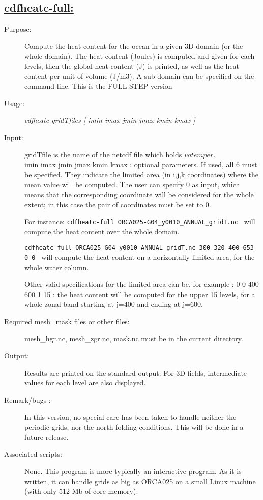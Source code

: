 \documentclass[a4paper,11pt]{article}
\begin{document}
\subsection*{\underline{cdfheatc-full:}}
\begin{description}
\item[Purpose:] Compute the heat content for the ocean in a given 3D domain (or the whole domain).
The heat content (Joules) is computed and given for each levels, then the global heat content (J) is printed, as well as the heat
content per unit of volume (J/m3). A sub-domain can be specified  on the command line. This is the FULL STEP version
\item[Usage:] {\em cdfheatc gridTfiles  [ imin imax jmin jmax kmin kmax ] }
\item[Input:] gridTfile is the name of the netcdf file which holds $votemper$.  \\

imin imax jmin jmax  kmin kmax : optional parameters. If used, all 6 must be specified. They indicate the limited
area (in i,j,k coordinates) where the mean value will be computed. The user can specify 0 as input, which means that
the corresponding coordinate will be considered for the whole extent; in this case the pair of coordinates must be set 
to 0. 

For instance: {\tt cdfheatc-full  ORCA025-G04\_y0010\_ANNUAL\_gridT.nc  } will compute the heat content over
the whole domain.

 {\tt cdfheatc-full  ORCA025-G04\_y0010\_ANNUAL\_gridT.nc 300 320 400 653 0 0 } will compute the heat content 
on a horizontally limited area, for the whole water column. 

 Other valid specifications for the limited area 
can be, for example : 0 0  400 600 1 15 : the heat content will be computed for the upper 15 levels, for a whole zonal band starting
at j=400 and ending at j=600.

\item[Required mesh\_mask files or other files:]   mesh\_hgr.nc, mesh\_zgr.nc, mask.nc must be in the current directory.
\item[Output:] Results are printed  on the standard output. For 3D fields, intermediate  values for each level are also
displayed.
\item[Remark/bugs :] In this version, no special care has been taken to handle neither the periodic grids, nor the north folding conditions.
This will be done in a future release.
\item[Associated scripts:] {None. This program is more typically an interactive program. As it is written, it can handle grids as big
as ORCA025 on a small Linux machine (with only 512 Mb of core memory).}
\end{description}
\end{document}
